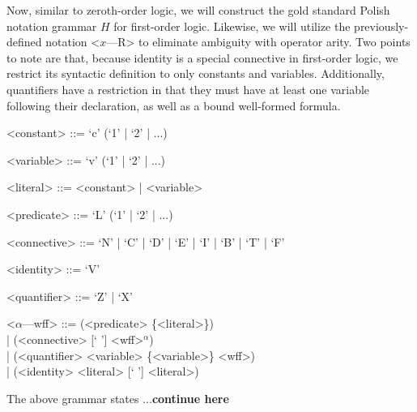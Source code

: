 \documentclass[ms]{uncgdissertationexp2}
\theoremstyle{plain}
\theoremstyle{definition}
\theoremstyle{remark}
\begin{document}
Now, similar to zeroth-order logic, we will construct the gold standard Polish notation grammar $H$ for first-order logic. Likewise, we will utilize the previously-defined notation \textless{$x$---R\textgreater} to eliminate ambiguity with operator arity. Two points to note are that, because identity is a special connective in first-order logic, we restrict its syntactic definition to only constants and variables. Additionally, quantifiers have a restriction in that they must have at least one variable following their declaration, as well as a bound well-formed formula.
\begin{grammar}
	
	<constant> ::= `c' (`1' | `2' | ...)
	
	<variable> ::= `v' (`1' | `2' | ...)
	
	<literal> ::= <constant> | <variable>
	
	<predicate> ::= `L' (`1' | `2' | ...)
	
	<connective> ::= `N' | `C' | `D' | `E' | `I' | `B' | `T' | `F'
	
	<identity> ::= `V'
	
	<quantifier> ::= `Z' | `X'
	
	<$\alpha$---wff> ::= (<predicate> \{<literal>\}) \\| (<connective> [` '] <wff>$^{\alpha}$) \\| (<quantifier> <variable> \{<variable>\} <wff>)\\| (<identity> <literal> [` '] <literal>)
\end{grammar}
The above grammar states ...\textbf{continue here}
\end{document}
